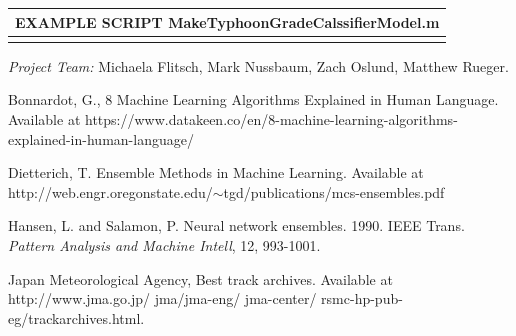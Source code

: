 \documentclass{SBCbookchapter}
\begin{document}
	
	\begin{table}[!htpb]
		\begin{tabular}{|l|}
			\multicolumn{1}{l}{{EXAMPLE SCRIPT} {\tiny MakeTyphoonGradeCalssifierModel.m} }\\\hline
			\parbox[b]{5.9in}{}\\\hline
		\end{tabular}
	\end{table}
	
	
	
	\emph{Project Team:} Michaela Flitsch, Mark Nussbaum, Zach Oslund, Matthew Rueger.
	
	\newpage
	\begin{thebibliography}{9}
		
		  {Bonnardot, G.}, 8 Machine Learning Algorithms Explained in Human Language. Available at https://www.datakeen.co/en/8-machine-learning-algorithms-explained-in-human-language/
		
		 {Dietterich, T.} Ensemble Methods in Machine Learning.  Available at http://web.engr.oregonstate.edu/$\sim$tgd/publications/mcs-ensembles.pdf
		
		 {Hansen, L. and Salamon, P.} Neural network ensembles. 1990. IEEE Trans. \emph{Pattern Analysis and Machine Intell}, 12, 993-1001.
		
		 {Japan Meteorological Agency},  Best track archives. Available at  http://www.jma.go.jp/ jma/jma-eng/ jma-center/ rsmc-hp-pub-eg/trackarchives.html.
		
	\end{thebibliography}
\end{document}
